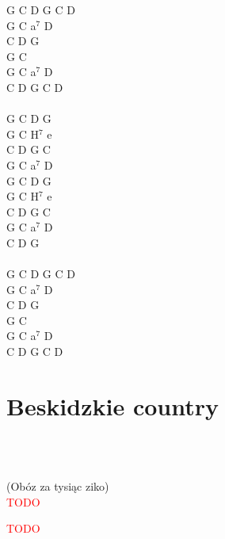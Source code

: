 \documentclass[a5paper, 10pt]{book}
\begin{document}
\begin{minipage}[t]{0.22\textwidth}
G C D G C D\\
G C a$^7$ D\\
C D G\\
G C\\
G C a$^7$ D\\
C D G C D\\
\\
G C D G\\
G C H$^7$ e\\
C D G C\\
G C a$^7$ D\\

G C D G\\
G C H$^7$ e\\
C D G C\\
G C a$^7$ D\\
C D G\\
\\
G C D G C D\\
G C a$^7$ D\\
C D G\\
G C\\
G C a$^7$ D\\
C D G C D\\
\end{minipage}

\newpage
\section{Beskidzkie country}\textcolor{lightgray}{\textit{}}\\~\\
\begin{minipage}[t]{0.8\textwidth}
(Obóz za tysiąc ziko)\\
\textcolor{red}{TODO}\\
\end{minipage}
\begin{minipage}[t]{0.2\textwidth}
\textcolor{red}{TODO}\\
\end{minipage}

\newpage
\end{document}
